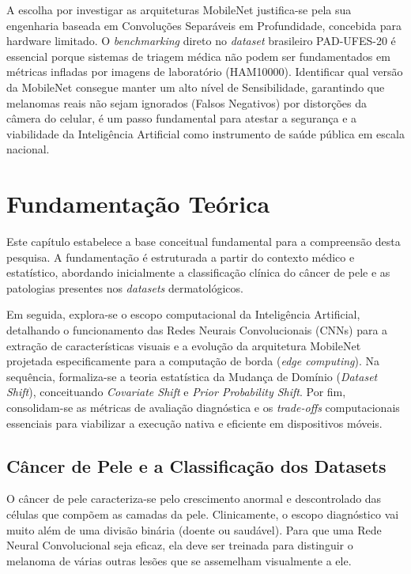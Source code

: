 \documentclass[oneside,english,brazilian]{UNISINOSmonografia}
\begin{document}
A escolha por investigar as arquiteturas MobileNet justifica-se pela sua engenharia baseada em Convoluções Separáveis em Profundidade, concebida para hardware limitado. O \textit{benchmarking} direto no \textit{dataset} brasileiro PAD-UFES-20 é essencial porque sistemas de triagem médica não podem ser fundamentados em métricas infladas por imagens de laboratório (HAM10000). Identificar qual versão da MobileNet consegue manter um alto nível de Sensibilidade, garantindo que melanomas reais não sejam ignorados (Falsos Negativos) por distorções da câmera do celular, é um passo fundamental para atestar a segurança e a viabilidade da Inteligência Artificial como instrumento de saúde pública em escala nacional.


\chapter{Fundamentação Teórica}
Este capítulo estabelece a base conceitual fundamental para a compreensão desta pesquisa. A fundamentação é estruturada a partir do contexto médico e estatístico, abordando inicialmente a classificação clínica do câncer de pele e as patologias presentes nos \textit{datasets} dermatológicos. 

Em seguida, explora-se o escopo computacional da Inteligência Artificial, detalhando o funcionamento das Redes Neurais Convolucionais (CNNs) para a extração de características visuais e a evolução da arquitetura MobileNet projetada especificamente para a computação de borda (\textit{edge computing}). Na sequência, formaliza-se a teoria estatística da Mudança de Domínio (\textit{Dataset Shift}), conceituando \textit{Covariate Shift} e \textit{Prior Probability Shift}. Por fim, consolidam-se as métricas de avaliação diagnóstica e os \textit{trade-offs} computacionais essenciais para viabilizar a execução nativa e eficiente em dispositivos móveis.

\section{Câncer de Pele e a Classificação dos Datasets}

O câncer de pele caracteriza-se pelo crescimento anormal e descontrolado das células que compõem as camadas da pele. Clinicamente, o escopo diagnóstico vai muito além de uma divisão binária (doente ou saudável). Para que uma Rede Neural Convolucional seja eficaz, ela deve ser treinada para distinguir o melanoma de várias outras lesões que se assemelham visualmente a ele.
\end{document}
